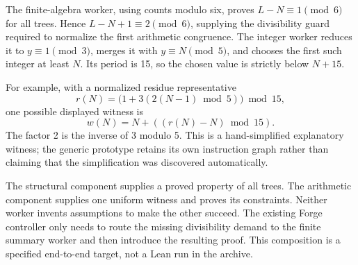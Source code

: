 The finite-algebra worker, using counts modulo six, proves
$L-N\equiv1\pmod6$ for all trees. Hence $L-N+1\equiv2\pmod6$, supplying the
divisibility guard required to normalize the first arithmetic congruence.
The integer worker reduces it to $y\equiv1\pmod3$, merges it with
$y\equiv N\pmod5$, and chooses the first such integer at least $N$. Its period
is 15, so the chosen value is strictly below $N+15$.

For example, with a normalized residue representative
\[
 r(N)=\bigl(1+3(2(N-1)\bmod5)\bigr)\bmod15,
\]
one possible displayed witness is
\[
 w(N)=N+((r(N)-N)\bmod15).
\]
The factor 2 is the inverse of 3 modulo 5. This is a hand-simplified explanatory
witness; the generic prototype retains its own instruction graph rather than
claiming that the simplification was discovered automatically.

The structural component supplies a proved property of all trees. The arithmetic
component supplies one uniform witness and proves its constraints. Neither
worker invents assumptions to make the other succeed. The existing Forge
controller only needs to route the missing divisibility demand to the finite
summary worker and then introduce the resulting proof. This composition is a
specified end-to-end target, not a Lean run in the archive.
